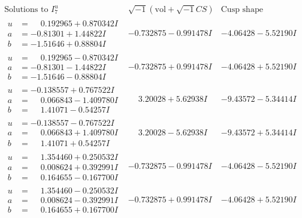 \documentclass[1p]{elsarticle_modified}
\theoremstyle{definition}
\newcommand{\I}{\sqrt{-1}}
\begin{document}
$$\begin{array}{c|c|c}  
\text{Solutions to }I^u_{7}& \I (\text{vol} + \sqrt{-1}CS) & \text{Cusp shape}\\
 \hline 
\begin{aligned}
u &= \phantom{-}0.192965 + 0.870342 I \\
a &= -0.81301 + 1.44822 I \\
b &= -1.51646 + 0.88804 I\end{aligned}
 & -0.732875 - 0.991478 I & -4.06428 - 5.52190 I \\ \hline\begin{aligned}
u &= \phantom{-}0.192965 - 0.870342 I \\
a &= -0.81301 - 1.44822 I \\
b &= -1.51646 - 0.88804 I\end{aligned}
 & -0.732875 + 0.991478 I & -4.06428 + 5.52190 I \\ \hline\begin{aligned}
u &= -0.138557 + 0.767522 I \\
a &= \phantom{-}0.066843 - 1.409780 I \\
b &= \phantom{-}1.41071 - 0.54257 I\end{aligned}
 & \phantom{-}3.20028 + 5.62938 I & -9.43572 - 5.34414 I \\ \hline\begin{aligned}
u &= -0.138557 - 0.767522 I \\
a &= \phantom{-}0.066843 + 1.409780 I \\
b &= \phantom{-}1.41071 + 0.54257 I\end{aligned}
 & \phantom{-}3.20028 - 5.62938 I & -9.43572 + 5.34414 I \\ \hline\begin{aligned}
u &= \phantom{-}1.354460 + 0.250532 I \\
a &= \phantom{-}0.008624 + 0.392991 I \\
b &= \phantom{-}0.164655 - 0.167700 I\end{aligned}
 & -0.732875 - 0.991478 I & -4.06428 - 5.52190 I \\ \hline\begin{aligned}
u &= \phantom{-}1.354460 - 0.250532 I \\
a &= \phantom{-}0.008624 - 0.392991 I \\
b &= \phantom{-}0.164655 + 0.167700 I\end{aligned}
 & -0.732875 + 0.991478 I & -4.06428 + 5.52190 I \\ \hline\begin{aligned}

\end{aligned}
\end{array}$$
\end{document}
